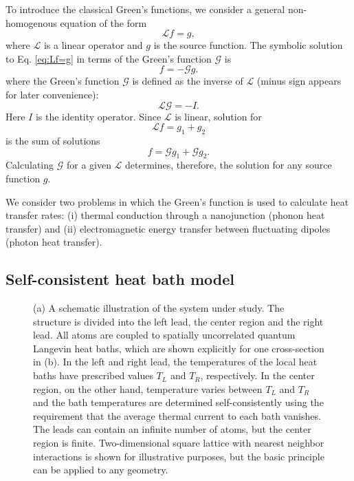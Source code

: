 To introduce the classical Green's functions, we consider a general non-homogenous equation of the form
 \begin{equation}
  \mathcal{L} f = g, \label{eq:Lf=g}
 \end{equation}
 where $\mathcal{L}$ is a linear operator and $g$ is the source function. The symbolic solution to Eq. \eqref{eq:Lf=g} in terms of the Green's function $\mathcal{G}$ is
 \begin{equation}
  f = -\mathcal{G} g.
 \end{equation}
where the Green's function $\mathcal{G}$ is defined as the inverse of $\mathcal{L}$ (minus sign appears for later convenience):
 \begin{equation}
  \mathcal{L} \mathcal{G} = -I.
 \end{equation}
 Here $I$ is the identity operator. Since $\mathcal{L}$ is linear, solution for 
 \begin{equation}
 \mathcal{L} f = g_1 + g_2
 \end{equation}
 is the sum of solutions
 \begin{equation}
  f = \mathcal{G}g_1 + \mathcal{G} g_2.
 \end{equation}
 Calculating $\mathcal{G}$ for a given $\mathcal{L}$ determines, therefore, the solution for any source function $g$. 

We consider two problems in which the Green's function is used to calculate heat transfer rates: (i) thermal conduction through a nanojunction (phonon heat transfer) and (ii) electromagnetic energy transfer between fluctuating dipoles (photon heat transfer).
\fi
\subsection{Self-consistent heat bath model}

\begin{figure}
\begin{center}
 \caption{(a) A schematic illustration of the system under study. The structure is divided into the left lead, the center region and the right lead. All atoms are coupled to spatially uncorrelated quantum Langevin heat baths, which are shown explicitly for one cross-section in (b). In the left and right lead, the temperatures of the local heat baths have prescribed values $T_L$ and $T_R$, respectively. In the center region, on the other hand, temperature varies between $T_L$ and $T_R$ and the bath temperatures are determined self-consistently using the requirement that the average thermal current to each bath vanishes. The leads can contain an infinite number of atoms, but the center region is finite. Two-dimensional square lattice with nearest neighbor interactions is shown for illustrative purposes, but the basic principle can be applied to any geometry.}
\label{fig:sud1}
\end{center}
\end{figure}

